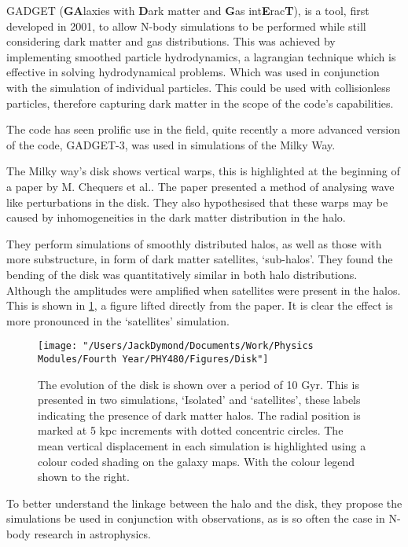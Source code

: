 \documentclass[a4paper,10pt]{article}
\begin{document}
GADGET (\textbf{GA}laxies with \textbf{D}ark matter and \textbf{G}as int\textbf{E}rac\textbf{T}), is a tool, first developed in 2001\cite{Gadget}, to allow N-body simulations to be performed while still considering dark matter and gas distributions. This was achieved by implementing smoothed particle hydrodynamics, a lagrangian technique which is effective in solving hydrodynamical problems. Which was used in conjunction with the simulation of individual particles. This could be used with collisionless particles, therefore capturing dark matter in the scope of the code's capabilities. 

The code has seen prolific use in the field, quite recently a more advanced version of the code, GADGET-3, was used in simulations of the Milky Way. 

The Milky way's disk shows vertical warps, this is highlighted at the beginning of a paper by M. Chequers et al.\cite{Bendy}. The paper presented a method of analysing wave like perturbations in the disk. They also hypothesised that these warps may be caused by inhomogeneities in the dark matter distribution in the halo. 

They perform simulations of smoothly distributed halos, as well as those with more substructure, in form of dark matter satellites, `sub-halos'. They found the bending of the disk was quantitatively similar in both halo distributions. Although the amplitudes were amplified when satellites were present in the halos. This is shown in \cref{Disk}, a figure lifted directly from the paper. It is clear the effect is more pronounced in the `satellites' simulation.

\begin{figure}[h!]
\centering
\texttt{[image: "/Users/JackDymond/Documents/Work/Physics Modules/Fourth Year/PHY480/Figures/Disk"]}
\caption{The evolution of the disk is shown over a period of 10 Gyr. This is presented in two simulations, `Isolated' and `satellites', these labels indicating the presence of dark matter halos. The radial position is marked at 5 kpc increments with dotted concentric circles. The mean vertical displacement in each simulation is highlighted using a colour coded shading on the galaxy maps. With the colour legend shown to the right.}
\label{Disk}
\end{figure}

To better understand the linkage between the halo and the disk, they propose the simulations be used in conjunction with observations, as is so often the case in N-body research in astrophysics.
\end{document}
